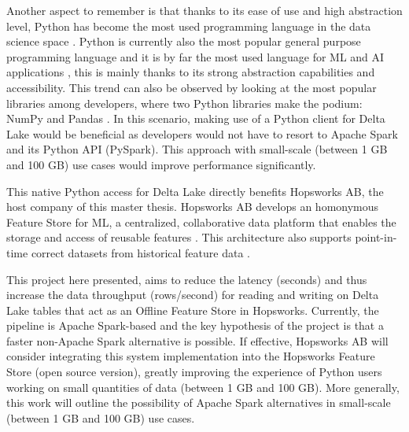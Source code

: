 Another aspect to remember is that thanks to its ease of use and high abstraction level, Python has become the most used programming language in the data science space \cite{nagpalPythonDataAnalytics2019}. Python is currently also the most popular general purpose programming language \cite{TIOBEIndex, StackOverflowDeveloper} and it is by far the most used language for \gls{ML} and \gls{AI} applications \cite{python-machine-learning}, this is mainly thanks to its strong abstraction capabilities and accessibility. This trend can also be observed by looking at the most popular libraries among developers, where two Python libraries make the podium: NumPy and Pandas \cite{StackOverflowDeveloper}.
In this scenario, making use of a Python client for Delta Lake would be beneficial as developers would not have to resort to Apache Spark and its Python \gls{API} (PySpark). This approach with small-scale (between 1 GB and 100 GB) use cases would improve performance significantly.

This native Python access for Delta Lake directly benefits Hopsworks \gls{AB}, the host company of this master thesis. Hopsworks \gls{AB} develops an homonymous Feature Store for \gls{ML}, a centralized, collaborative data platform that enables the storage and access of reusable features \cite{HopsworksBatchRealtime2024}. This architecture also supports point-in-time correct datasets from historical feature data \cite{Pettersson1695672}.

This project here presented, aims to reduce the latency (seconds) and thus increase the data throughput (rows/second) for reading and writing on Delta Lake tables that act as an Offline Feature Store in Hopsworks. Currently, the pipeline is Apache Spark-based and the key hypothesis of the project is that a faster non-Apache Spark alternative is possible. If effective, Hopsworks \gls{AB} will consider integrating this system implementation into the Hopsworks Feature Store (open source version), greatly improving the experience of Python users working on small quantities of data (between 1 GB and 100 GB). More generally, this work will outline the possibility of Apache Spark alternatives in small-scale (between 1 GB and 100 GB) use cases.
